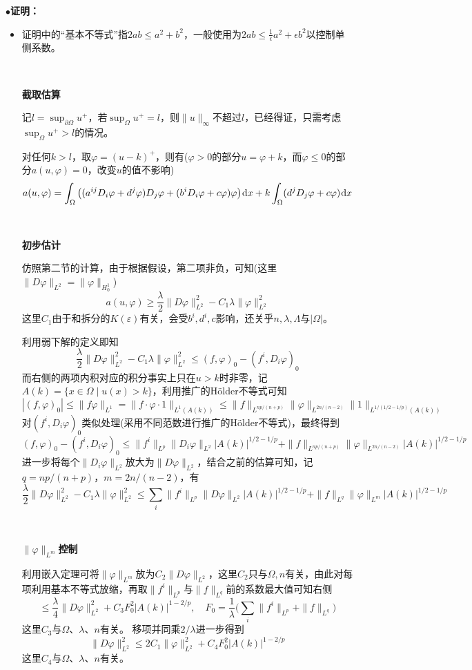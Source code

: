 \documentclass[a4paper,UTF8,fontset=windows,AutoFakeBold]{ctexart}
\newcommand*{\dr}{\hspace{0.07em}\mathrm{d}}
\newcommand{\proo}[1]{{\kaishu $\bullet$\textbf{证明：}
\begin{itemize}
    \item[] #1
\end{itemize}
}}
\begin{document}
\proo{
    证明中的``基本不等式''指$2ab\le a^2+b^2$，一般使用为$2ab\le\frac{1}{\epsilon}a^2+\epsilon b^2$以控制单侧系数。

    \

    \textbf{截取估算}

    记$l=\sup_{\partial\Omega}u^+$，若$\sup_\Omega u^+=l$，则$\|u\|_\infty$不超过$l$，已经得证，只需考虑$\sup_\Omega u^+>l$的情况。

    对任何$k>l$，取$\varphi=(u-k)^+$，则有($\varphi>0$的部分$u=\varphi+k$，而$\varphi\le0$的部分$a(u,\varphi)=0$，改变$u$的值不影响)
    $$a(u,\varphi)=\int_\Omega\big((a^{ij}D_i\varphi+d^j\varphi)D_j\varphi+(b^iD_i\varphi+c\varphi)\varphi\big)\dr x+k\int_\Omega(d^jD_j\varphi+c\varphi)\dr x$$

    \

    \textbf{初步估计}

    仿照第二节的计算，由于根据假设，第二项非负，可知(这里$\|D\varphi\|_{L^2}=\|\varphi\|_{H_0^1}$)
    $$a(u,\varphi)\ge\frac{\lambda}{2}\|D\varphi\|_{L^2}^2-C_1\lambda\|\varphi\|_{L^2}^2$$
    这里$C_1$由于和拆分的$K(\varepsilon)$有关，会受$b^i,d^i,c$影响，还关乎$n,\lambda,\Lambda$与$|\Omega|$。

    利用弱下解的定义即知
    $$\frac{\lambda}{2}\|D\varphi\|_{L^2}^2-C_1\lambda\|\varphi\|_{L^2}^2\le(f,\varphi)_0-(f^i,D_i\varphi)_0$$
    而右侧的两项内积对应的积分事实上只在$u>k$时非零，记$A(k)=\{x\in\Omega\mid u(x)>k\}$，利用推广的H\"older不等式可知
    $$|(f,\varphi)_0|\le\|f\varphi\|_{L^1}=\|f\cdot\varphi\cdot1\|_{L^1(A(k))}\le\|f\|_{L^{np/(n+p)}}\|\varphi\|_{L^{2n/(n-2)}}\|1\|_{L^{1/(1/2-1/p)}(A(k))}$$
    对$(f^i,D_i\varphi)_0$类似处理(采用不同范数进行推广的H\"older不等式)，最终得到
    $$(f,\varphi)_0-(f^i,D_i\varphi)_0\le\|f^i\|_{L^p}\|D_i\varphi\|_{L^2}|A(k)|^{1/2-1/p}+\|f\|_{L^{np/(n+p)}}\|\varphi\|_{L^{2n/(n-2)}}|A(k)|^{1/2-1/p}$$
    进一步将每个$\|D_i\varphi\|_{L^2}$放大为$\|D\varphi\|_{L^2}$，结合之前的估算可知，记$q=np/(n+p)$，$m=2n/(n-2)$，有
    $$\frac{\lambda}{2}\|D\varphi\|_{L^2}^2-C_1\lambda\|\varphi\|_{L^2}^2\le\sum_i\|f^i\|_{L^p}\|D\varphi\|_{L^2}|A(k)|^{1/2-1/p}+\|f\|_{L^q}\|\varphi\|_{L^m}|A(k)|^{1/2-1/p}$$

    \

    \textbf{$\|\varphi\|_{L^m}$控制}

    利用嵌入定理可将$\|\varphi\|_{L^m}$放为$C_2\|D\varphi\|_{L^2}$，这里$C_2$只与$\Omega,n$有关，由此对每项利用基本不等式放缩，再取$\|f^i\|_{L^p}$与$\|f\|_{L^q}$前的系数最大值可知右侧
    $$\le\frac{\lambda}{4}\|D\varphi\|_{L^2}^2+C_3F_0^2|A(k)|^{1-2/p},\quad F_0=\frac{1}{\lambda}\bigg(\sum_i\|f^i\|_{L^p}+\|f\|_{L^q}\bigg)$$
    这里$C_3$与$\Omega$、$\lambda$、$n$有关。
    移项并同乘$2/\lambda$进一步得到
    $$\|D\varphi\|_{L^2}^2\le 2C_1\|\varphi\|_{L^2}^2+C_4F_0^2|A(k)|^{1-2/p}$$
    这里$C_4$与$\Omega$、$\lambda$、$n$有关。

}
\end{document}
